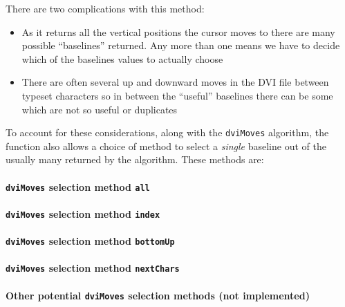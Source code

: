 \documentclass[]{article}
\let\oldparagraph\paragraph
\renewcommand{\paragraph}[1]{\oldparagraph{#1}\mbox{}}
\begin{document}
There are two complications with this method:

\begin{itemize}
\item
  As it returns all the vertical positions the cursor moves to there are
  many possible ``baselines'' returned. Any more than one means we have
  to decide which of the baselines values to actually choose
\item
  There are often several up and downward moves in the DVI file between
  typeset characters so in between the ``useful'' baselines there can be
  some which are not so useful or duplicates
\end{itemize}

To account for these considerations, along with the \texttt{dviMoves}
algorithm, the function also allows a choice of method to select a
\emph{single} baseline out of the usually many returned by the
algorithm. These methods are:

\paragraph{\texorpdfstring{\texttt{dviMoves} selection method
\texttt{all}}{dviMoves selection method all}}\label{dvimoves-selection-method-all}

\paragraph{\texorpdfstring{\texttt{dviMoves} selection method
\texttt{index}}{dviMoves selection method index}}\label{dvimoves-selection-method-index}

\paragraph{\texorpdfstring{\texttt{dviMoves} selection method
\texttt{bottomUp}}{dviMoves selection method bottomUp}}\label{dvimoves-selection-method-bottomup}

\paragraph{\texorpdfstring{\texttt{dviMoves} selection method
\texttt{nextChars}}{dviMoves selection method nextChars}}\label{dvimoves-selection-method-nextchars}

\paragraph{\texorpdfstring{Other potential \texttt{dviMoves} selection
methods (not
implemented)}{Other potential dviMoves selection methods (not implemented)}}\label{other-potential-dvimoves-selection-methods-not-implemented}
\end{document}

